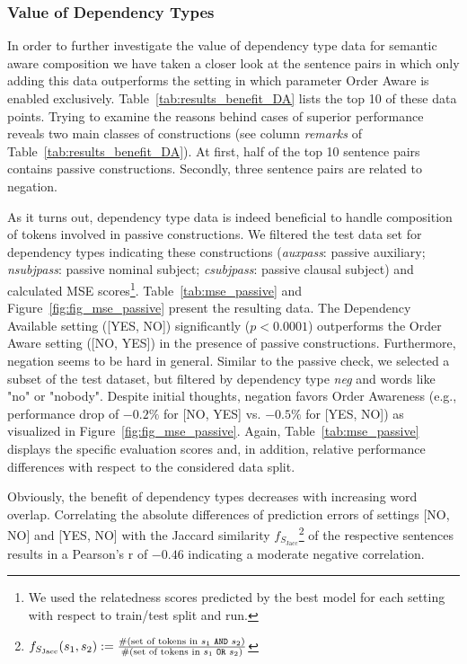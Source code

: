 
\subsubsection{Value of Dependency Types}
In order to further investigate the value of dependency type data for semantic aware composition we have taken a closer look at the sentence pairs in which only adding this data outperforms the setting in which parameter Order Aware is enabled exclusively. Table~\ref{tab:results_benefit_DA} lists the top 10 of these data points. Trying to examine the reasons behind cases of superior performance reveals two main classes of constructions (see column \textit{remarks} of Table~\ref{tab:results_benefit_DA}). At first, half of the top 10 sentence pairs contains passive constructions. Secondly, three sentence pairs are related to negation. 

As it turns out, dependency type data is indeed beneficial to handle composition of tokens involved in passive constructions. We filtered the test data set for dependency types indicating these constructions (\textit{auxpass}: passive auxiliary; \textit{nsubjpass}: passive nominal subject; \textit{csubjpass}: passive clausal subject) and calculated \ac{MSE} scores\footnote{We used the relatedness scores predicted by the best model for each setting with respect to train/test split and run.}. Table~\ref{tab:mse_passive} and Figure~\ref{fig:fig_mse_passive} present the resulting data. The Dependency Available setting ([YES, NO]) significantly ($p < 0.0001$) outperforms the Order Aware setting ([NO, YES]) in the presence of passive constructions. Furthermore, negation seems to be hard  in general. Similar to the passive check, we selected a subset of the test dataset, but filtered by dependency type \textit{neg} and words like "no" or "nobody". Despite initial thoughts, negation favors Order Awareness (e.g., performance drop of $-0.2\%$ for [NO, YES] vs. $-0.5\%$ for [YES, NO]) as visualized in Figure~\ref{fig:fig_mse_passive}. Again, Table~\ref{tab:mse_passive} displays the specific evaluation scores and, in addition, relative performance differences with respect to the considered data split.

Obviously, the benefit of dependency types decreases with increasing word overlap. Correlating the absolute differences of prediction errors of settings [NO, NO] and [YES, NO] with the Jaccard similarity $f_{S_\text{Jacc}}$\footnote{$f_{S_\text{Jacc}}(s_1, s_2) := \frac{\text{\#(set of tokens in $s_1$ \texttt{AND} $s_2$)}}{\text{\#(set of tokens in $s_1$ \texttt{OR} $s_2$)}}$} of the respective sentences results in a Pearson's r of $-0.46$ indicating a moderate negative correlation.

